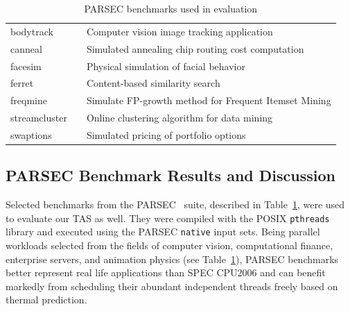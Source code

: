 \documentclass[times, 10pt,twocolumn]{IEEEtran}
\begin{document}
\begin{table}[tbp] 
\centering
 \caption{PARSEC benchmarks used in evaluation}
\label{tab:parsecbench}
\begin{tabular}[bthp]{l l p{5cm}} 
\hline 
\hline 
bodytrack &  & Computer vision image tracking application \\
canneal &  & Simulated annealing chip routing cost computation \\
facesim &  & Physical simulation of facial behavior \\
ferret &  & Content-based similarity search \\
freqmine &  & Simulate FP-growth method for Frequent Itemset Mining \\
streamcluster &  & Online clustering algorithm for data mining \\
swaptions &  & Simulated pricing of portfolio options \\
\hline
\end{tabular}
\end{table}
\subsection{PARSEC Benchmark Results and Discussion}
\label{sec:mult-behav} 
Selected benchmarks from the PARSEC~\cite{Bienia2008} suite, described
in Table~\ref{tab:parsecbench}, were used to evaluate our TAS as well.
They were compiled with the POSIX \texttt{pthreads} library and executed
using the PARSEC \texttt{native} input sets.  Being parallel workloads
selected from the fields of computer vision, computational finance,
enterprise servers, and animation physics (see Table~\ref{tab:parsecbench}), PARSEC
benchmarks better represent real life applications than SPEC CPU2006 and
can benefit markedly from scheduling their abundant independent threads
freely based on thermal prediction.
\end{document}
